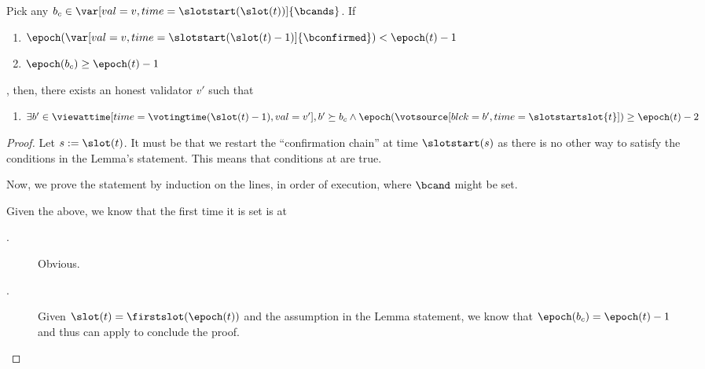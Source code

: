 \documentclass{article}
\begin{document}
\begin{lemma}\label{lem:when-restarting-vs-from-prev-epoch}
    Pick any $b_c \in  \var[val=v,time=\slotstart(\slot(t))]{\bcands}$.
    If
    \begin{enumerate}
        \item $\epoch(\var[val=v,time=\slotstart(\slot(t)-1)]{\bconfirmed}) < \epoch(t)-1$
        \item $\epoch(b_c) \geq \epoch(t)-1$
    \end{enumerate},
    then, there exists an honest validator $v'$ such that 
    \begin{enumerate}
        \item $\exists b' \in \viewattime[time=\votingtime(\slot(t)-1),val=v'], b' \succeq b_c \land \epoch(\votsource[blck=b',time=\slotstartslot{t}])\geq \epoch(t)-2$
    \end{enumerate}
\end{lemma}
\begin{proof}
    Let $s:= \slot(t)$.
    It must be that we restart the ``confirmation chain'' at time $\slotstart(s)$ as there is no other way to satisfy the conditions in the Lemma's statement.
    This means that conditions at  are true.

    Now, we prove the statement by induction on the lines, in order of execution, where $\bcand$ might be set.
    
    Given the above, we know that the first time it is set is at 

    \begin{description}
        \item[.] Obvious.  
        \item[.] Given $\slot(t) = \firstslot(\epoch(t))$ and the assumption in the Lemma statement, we know that $\epoch(b_c) = \epoch(t) - 1$ and thus can apply  to conclude the proof.
    \end{description}
\end{proof}
\end{document}
